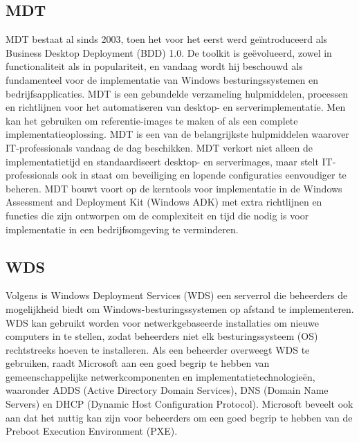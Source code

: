 \subsection{MDT}
MDT bestaat al sinds 2003, toen het voor het eerst werd geïntroduceerd als Business Desktop Deployment (BDD) 1.0. De toolkit is geëvolueerd, zowel in functionaliteit als in populariteit, en vandaag wordt hij beschouwd als fundamenteel voor de implementatie van Windows besturingssystemen en bedrijfsapplicaties.
\newline
MDT is een gebundelde verzameling hulpmiddelen, processen en richtlijnen voor het automatiseren van desktop- en serverimplementatie. Men kan het gebruiken om referentie-images te maken of als een complete implementatieoplossing. MDT is een van de belangrijkste hulpmiddelen waarover IT-professionals vandaag de dag beschikken. MDT verkort niet alleen de implementatietijd en standaardiseert desktop- en serverimages, maar stelt IT-professionals ook in staat om beveiliging en lopende configuraties eenvoudiger te beheren. MDT bouwt voort op de kerntools voor implementatie in de Windows Assessment and Deployment Kit (Windows ADK) met extra richtlijnen en functies die zijn ontworpen om de complexiteit en tijd die nodig is voor implementatie in een bedrijfsomgeving te verminderen.\autocite{Microsoft2021}

\subsection{WDS}
Volgens \textcite{Boger2014} is Windows Deployment Services (WDS) een serverrol die beheerders de mogelijkheid biedt om Windows-besturingssystemen op afstand te implementeren. 
\newline
WDS kan gebruikt worden voor netwerkgebaseerde installaties om nieuwe computers in te stellen, zodat beheerders niet elk besturingssysteem (OS) rechtstreeks hoeven te installeren.
\newline
Als een beheerder overweegt WDS te gebruiken, raadt Microsoft aan een goed begrip te hebben van gemeenschappelijke netwerkcomponenten en implementatietechnologieën, waaronder ADDS (Active Directory Domain Services), DNS (Domain Name Servers) en DHCP (Dynamic Host Configuration Protocol). Microsoft beveelt ook aan dat het nuttig kan zijn voor beheerders om een goed begrip te hebben van de Preboot Execution Environment (PXE).


